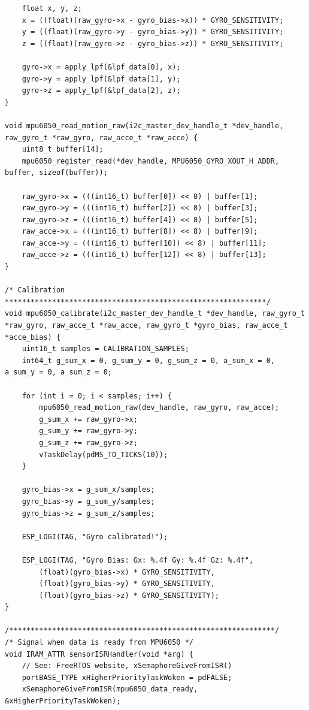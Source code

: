 \begin{lstlisting}
    float x, y, z; 
    x = ((float)(raw_gyro->x - gyro_bias->x)) * GYRO_SENSITIVITY;
    y = ((float)(raw_gyro->y - gyro_bias->y)) * GYRO_SENSITIVITY;
    z = ((float)(raw_gyro->z - gyro_bias->z)) * GYRO_SENSITIVITY;

    gyro->x = apply_lpf(&lpf_data[0], x);
    gyro->y = apply_lpf(&lpf_data[1], y);
    gyro->z = apply_lpf(&lpf_data[2], z);
}

void mpu6050_read_motion_raw(i2c_master_dev_handle_t *dev_handle, raw_gyro_t *raw_gyro, raw_acce_t *raw_acce) {
    uint8_t buffer[14];
    mpu6050_register_read(*dev_handle, MPU6050_GYRO_XOUT_H_ADDR, buffer, sizeof(buffer));

    raw_gyro->x = (((int16_t) buffer[0]) << 8) | buffer[1];
    raw_gyro->y = (((int16_t) buffer[2]) << 8) | buffer[3];
    raw_gyro->z = (((int16_t) buffer[4]) << 8) | buffer[5];
    raw_acce->x = (((int16_t) buffer[8]) << 8) | buffer[9];
    raw_acce->y = (((int16_t) buffer[10]) << 8) | buffer[11];
    raw_acce->z = (((int16_t) buffer[12]) << 8) | buffer[13];
}

/* Calibration *************************************************************/
void mpu6050_calibrate(i2c_master_dev_handle_t *dev_handle, raw_gyro_t *raw_gyro, raw_acce_t *raw_acce, raw_gyro_t *gyro_bias, raw_acce_t *acce_bias) {
    uint16_t samples = CALIBRATION_SAMPLES;
    int64_t g_sum_x = 0, g_sum_y = 0, g_sum_z = 0, a_sum_x = 0, a_sum_y = 0, a_sum_z = 0;

    for (int i = 0; i < samples; i++) {
        mpu6050_read_motion_raw(dev_handle, raw_gyro, raw_acce);
        g_sum_x += raw_gyro->x;
        g_sum_y += raw_gyro->y;
        g_sum_z += raw_gyro->z;
        vTaskDelay(pdMS_TO_TICKS(10)); 
    }

    gyro_bias->x = g_sum_x/samples;
    gyro_bias->y = g_sum_y/samples;
    gyro_bias->z = g_sum_z/samples;

    ESP_LOGI(TAG, "Gyro calibrated!");

    ESP_LOGI(TAG, "Gyro Bias: Gx: %.4f Gy: %.4f Gz: %.4f",
        (float)(gyro_bias->x) * GYRO_SENSITIVITY,
        (float)(gyro_bias->y) * GYRO_SENSITIVITY,
        (float)(gyro_bias->z) * GYRO_SENSITIVITY);
}

/**************************************************************/
/* Signal when data is ready from MPU6050 */
void IRAM_ATTR sensorISRHandler(void *arg) {
    // See: FreeRTOS website, xSemaphoreGiveFromISR()
    portBASE_TYPE xHigherPriorityTaskWoken = pdFALSE;
    xSemaphoreGiveFromISR(mpu6050_data_ready, &xHigherPriorityTaskWoken);


\end{lstlisting}
